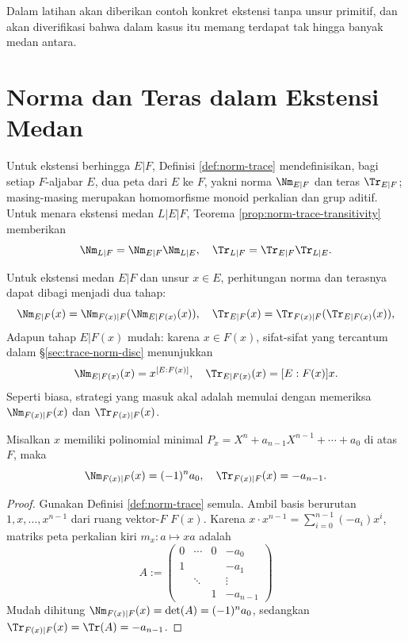 Dalam latihan akan diberikan contoh konkret ekstensi tanpa unsur primitif, dan akan diverifikasi bahwa dalam kasus itu memang terdapat tak hingga banyak medan antara.

\section{Norma dan Teras dalam Ekstensi Medan}\label{sec:norm-trace-fields} 
Untuk ekstensi berhingga $E|F$, Definisi \ref{def:norm-trace} mendefinisikan, bagi setiap $F$-aljabar $E$, dua peta dari $E$ ke $F$, yakni norma $\Nm_{E|F}$ dan teras $\Tr_{E|F}$; masing-masing merupakan homomorfisme monoid perkalian dan grup aditif. Untuk menara ekstensi medan $L|E|F$, Teorema \ref{prop:norm-trace-transitivity} memberikan
\[ \Nm_{L|F} = \Nm_{E|F} \Nm_{L|E}, \quad \Tr_{L|F}=\Tr_{E|F}\Tr_{L|E}. \]

Untuk ekstensi medan $E|F$ dan unsur $x \in E$, perhitungan norma dan terasnya dapat dibagi menjadi dua tahap:
\[ \Nm_{E|F}(x) = \Nm_{F(x)|F}(\Nm_{E|F(x)}(x)), \quad \Tr_{E|F}(x)=\Tr_{F(x)|F}(\Tr_{E|F(x)}(x)), \]
Adapun tahap $E|F(x)$ mudah: karena $x \in F(x)$, sifat-sifat yang tercantum dalam \S\ref{sec:trace-norm-disc} menunjukkan
\begin{gather}\label{eqn:norm-trace-field-prepa}
	\Nm_{E|F(x)}(x) = x^{[E:F(x)]}, \quad \Tr_{E|F(x)}(x) = [E:F(x)] x.
\end{gather}
Seperti biasa, strategi yang masuk akal adalah memulai dengan memeriksa $\Nm_{F(x)|F}(x)$ dan $\Tr_{F(x)|F}(x)$.

\begin{theorem}\label{prop:norm-trace-F(x)}
	Misalkan $x$ memiliki polinomial minimal $P_x = X^n + a_{n-1}X^{n-1} + \cdots + a_0$ di atas $F$, maka
	\[ \Nm_{F(x)|F}(x) = (-1)^n a_0, \quad \Tr_{F(x)|F}(x) = -a_{n-1}. \]
\end{theorem}
\begin{proof}
	Gunakan Definisi \ref{def:norm-trace} semula. Ambil basis berurutan $1, x, \ldots, x^{n-1}$ dari ruang vektor-$F$ $F(x)$. Karena $x \cdot x^{n-1} = \sum_{i=0}^{n-1} (-a_i)x^i$, matriks peta perkalian kiri $m_x: a \mapsto xa$ adalah
	\[ A := \begin{pmatrix}
		0 & \cdots & 0 & -a_0 \\
		1 & & & -a_1 \\
		& \ddots & & \vdots \\
		& & 1 & -a_{n-1}
	\end{pmatrix}\]
	Mudah dihitung $\Nm_{F(x)|F}(x) = \det(A) = (-1)^n a_0$, sedangkan $\Tr_{F(x)|F}(x) = \Tr(A) = -a_{n-1}$.
\end{proof}


